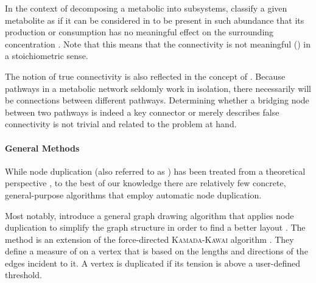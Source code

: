 \documentclass[
	fontsize=10pt, %
	twoside=false, %
	secnumdepth=1, %
  toc=indentunnumbered %
]{kaobook}
\begin{document}
In the context of decomposing a metabolic into subsystems,
\citeauthor{schuster_exploring_2002} classify a given metabolite as
 if it can be considered in to be present in such abundance that
its production or consumption has no meaningful effect on the surrounding
concentration
\cite{schuster_exploring_2002}.
Note that this means that the connectivity is not meaningful
() in a stoichiometric sense. 

The notion of true connectivity is also reflected in the concept of  \cite{kim_IdentificationCriticalConnectors_2019}. Because pathways
in a metabolic network seldomly work in isolation, there necessarily will be
connections between different pathways. Determining whether a bridging node
between two pathways is indeed a key connector or merely describes false
connectivity is not trivial and related to the problem at hand.

\paragraph{General Methods} While node duplication (also referred to as
) has been treated from a theoretical perspective
\cite{liebers_PlanarizingGraphsSurvey_2001,abu-khzam_ClusterEditingVertex_2018},
to the best of our knowledge there are relatively few concrete, general-purpose
algorithms that employ automatic node duplication.

Most notably, \citeauthor{eades_VertexSplittingTensionfree_1996} introduce a
general graph drawing algorithm that applies node duplication to simplify the
graph structure in order to find a better layout
\cite{eades_VertexSplittingTensionfree_1996}. The method is an extension of the
force-directed \textsc{Kamada-Kawai} algorithm
\cite{kamada_AlgorithmDrawingGeneral_1989}. They define a measure of
 on a vertex that is based on the lengths and directions of the
edges incident to it. A vertex is duplicated if its tension is above a
user-defined threshold.
\end{document}
